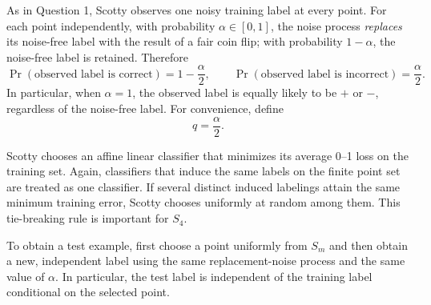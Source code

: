 As in Question 1, Scotty observes one noisy training label at every point. For
each point independently, with probability $\alpha\in[0,1]$, the noise process
\emph{replaces} its noise-free label with the result of a fair coin flip; with
probability $1-\alpha$, the noise-free label is retained. Therefore
\[
\Pr(\text{observed label is correct})=1-\frac{\alpha}{2},
\qquad
\Pr(\text{observed label is incorrect})=\frac{\alpha}{2}.
\]
In particular, when $\alpha=1$, the observed label is equally likely to be
$+$ or $-$, regardless of the noise-free label. For convenience, define
\[
q=\frac{\alpha}{2}.
\]

Scotty chooses an affine linear classifier that minimizes its average 0--1
loss on the training set. Again, classifiers that induce the same labels on
the finite point set are treated as one classifier. If several distinct
induced labelings attain the same minimum training error, Scotty chooses
uniformly at random among them. This tie-breaking rule is important for $S_4$.

To obtain a test example, first choose a point uniformly from $S_m$ and then
obtain a new, independent label using the same replacement-noise process and
the same value of $\alpha$. In particular, the test label is independent of
the training label conditional on the selected point.

